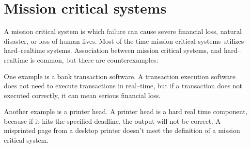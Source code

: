 \section{Mission critical systems}

A mission critical system is which failure can cause severe financial loss, natural disaster, or loss of human lives. Most of the time mission critical systems utilizes hard--realtime systems. Association between mission critical systems, and hard--realtime is common, but there are counterexamples:

One example is a bank transaction software. A transaction execution software does not need to execute transactions in real--time, but if a transaction does not executed correctly, it can mean serious financial loss.

Another example is a printer head. A printer head is a hard real time component, because if it hits the specified deadline, the output will not be correct. A misprinted page from a desktop printer doesn't meet the definition of a mission critical system.
